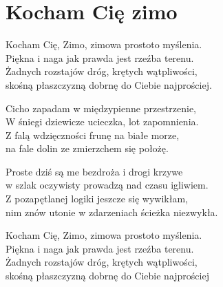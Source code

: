 \section{Kocham Cię zimo}
\begin{text}
Kocham Cię, Zimo, zimowa prostoto myślenia.\\
Piękna i naga jak prawda jest rzeźba terenu.\\
Żadnych rozstajów dróg, krętych wątpliwości,\\
skośną płaszczyzną dobrnę do Ciebie najprościej.

Cicho zapadam w międzypienne przestrzenie,\\
W śniegi dziewicze ucieczka, lot zapomnienia.\\
Z falą wdzięczności frunę na białe morze,\\
na fale dolin ze zmierzchem się położę.

Proste dziś są me bezdroża i drogi krzywe\\
w szlak oczywisty prowadzą nad czasu igliwiem.\\
Z pozapętlanej logiki jeszcze się wywikłam,\\
nim znów utonie w zdarzeniach ścieżka niezwykła.

Kocham Cię, Zimo, zimowa prostoto myślenia.\\
Piękna i naga jak prawda jest rzeźba terenu.\\
Żadnych rozstajów dróg, krętych wątpliwości,\\
skośną płaszczyzną dobrnę do Ciebie najprościej
\end{text}